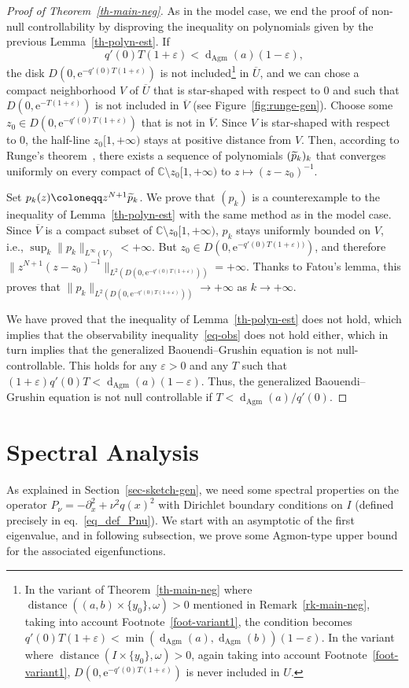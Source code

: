 \documentclass[AHL,Unicode,longabstracts,published]{cedram}
\newcommand{\1}{\mathds 1}
\DeclareMathOperator{\distance}{distance}
\newcommand{\dagmon}{\mathop{\mathrm{d}}\nolimits_{\mathrm{Agm}}}
\newcommand{\C}{\mathbb{C}}
\newcommand{\eu}{\mathrm e}
\newcommand{\e}{\varepsilon}
\renewcommand{\o}{\omega}
\let\oldtilde\tilde
\renewcommand*{\tilde}[1]{\mathchoice{\widetilde{#1}}{\widetilde{#1}}{\oldtilde{#1}}{\oldtilde{#1}}}
\renewcommand{\o}{\omega}
\begin{document}
\begin{proof}[Proof of Theorem~\ref{th-main-neg}]
As in the model case, we end the proof of non-null controllability by disproving the inequality on polynomials given by the previous Lemma~\ref{th-polyn-est}. If
\[
q'(0)T(1+\e)< \dagmon(a)(1-\e),
\]
the disk $D(0,\eu^{-q'(0)T(1+\e)})$ is not included\footnote{In the variant of Theorem~\ref{th-main-neg} where $\distance((a,b)\times\{y_0\},\o)>0$ mentioned in
Remark~\ref{rk-main-neg}, taking into account Footnote~\ref{foot-variant1}, the condition becomes $q'(0)T(1+\e) < \min(\dagmon(a),\dagmon(b))(1-\e)$. In the variant where $\distance(I\times\{y_0\},\o)>0$, again taking into account
Footnote~\ref{foot-variant1}, $D(0,\eu^{-q'(0)T(1+\e)})$ is never included in $U$.} in $\overline U$, and we can chose a compact neighborhood $V$ of $\overline U$ that is star-shaped with respect to $0$ and such that $D(0,\eu^{-T(1+\e)})$ is not included in $\overline V$ (see
Figure~\ref{fig:runge-gen}). Choose some $z_0\in D(0,\eu^{-q'(0)T(1+\e)})$ that is not in $\overline V$. Since $V$ is star-shaped with respect to $0$, the half-line $z_0[1,+\infty)$ stays at positive distance from $V$. Then, according to Runge's theorem~\cite[Theorem~13.9]{Rudin86}, there exists a sequence of polynomials $(\tilde p_k)_k$ that converges uniformly on every compact of $\C \setminus z_0[1,+\infty)$ to $z\mapsto (z-z_0)^{-1}$.

Set $p_k(z) \coloneqq z^{N+1} \tilde p_k$. We prove that $(p_k)$ is a counterexample to the inequality of Lemma~\ref{th-polyn-est} with the same method as in the model case. Since $\overline V$ is a compact subset of $\C \setminus z_0[1,+\infty)$, $p_k$ stays uniformly bounded on $V$, i.e., $\sup_k \|p_k\|_{L^\infty(V)} < +\infty$. But $z_0 \in D(0,\eu^{-q'(0)T(1+\e))})$, and therefore $\|z^{N+1}(z-z_0)^{-1}\|_{L^2(D(0,\eu^{-q'(0)T(1+\e)}))} = +\infty$. Thanks to Fatou's lemma, this proves that $\|p_k\|_{L^2(D(0,\eu^{-q'(0)T(1+\e)}))} \to +\infty$ as $k\to + \infty$.

We have proved that the inequality of Lemma~\ref{th-polyn-est} does not hold, which implies that the observability inequality~\eqref{eq-obs} does not hold either, which in turn implies that the generalized Baouendi--Grushin equation is not null-controllable. This holds for any $\e>0$ and any $T$ such that $(1+\e)q'(0)T< \dagmon(a)(1-\e)$. Thus, the generalized Baouendi--Grushin equation is not null controllable if $T< \dagmon(a)/q'(0)$.
\end{proof}


\section{Spectral Analysis}\label{sec-spectral}
As explained in Section~\ref{sec-sketch-gen}, we need some spectral properties on the operator $P_\nu = -\partial_x^2 + \nu^2 q(x)^2$ with Dirichlet boundary conditions on $I$ (defined precisely in eq.~\eqref{eq_def_Pnu}). We start with an asymptotic of the first eigenvalue, and in following subsection, we prove some Agmon-type upper bound for the associated eigenfunctions.
\end{document}
